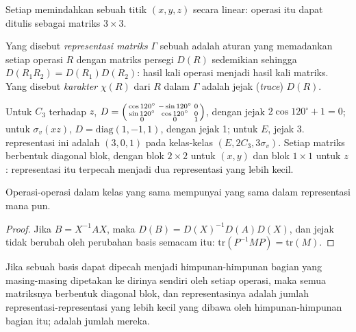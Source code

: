 Setiap  memindahkan sebuah titik $(x, y, z)$ secara linear:
operasi itu dapat ditulis sebagai matriks $3\times3$.

\begin{definition}\label{def:b3:point-groups:representation}
Yang disebut \emph{representasi matriks} $\Gamma$
sebuah  adalah aturan yang memadankan setiap operasi $R$ dengan
matriks persegi $D(R)$ sedemikian sehingga $D(R_1R_2) = D(R_1)D(R_2)$: hasil
kali operasi menjadi hasil kali matriks. Yang disebut
\emph{karakter} $\chi(R)$ dari $R$ dalam $\Gamma$ adalah jejak (\textit{trace})
$D(R)$.
\end{definition}

\begin{example}\label{ex:b3:point-groups:xyz}
Untuk $C_3$ terhadap $z$, $D = \begin{psmallmatrix}\cos120^\circ & -\sin120^\circ &
0\\ \sin120^\circ & \cos120^\circ & 0\\ 0 & 0 & 1\end{psmallmatrix}$, dengan
jejak $2\cos120^\circ + 1 = 0$; untuk $\sigma_v(xz)$,
$D = \mathrm{diag}(1, -1, 1)$, dengan jejak 1; untuk $E$, jejak 3.
 representasi ini adalah $(3, 0, 1)$ pada kelas-kelas
$(E, 2C_3, 3\sigma_v)$. Setiap matriks berbentuk diagonal blok, dengan blok
$2\times2$ untuk $(x, y)$ dan blok $1\times1$ untuk $z$: representasi itu
terpecah menjadi dua representasi yang lebih kecil.
\end{example}

\begin{proposition}\label{prop:b3:point-groups:class-characters}
Operasi-operasi dalam kelas yang sama mempunyai  yang sama dalam
representasi mana pun.
\end{proposition}

\begin{proof}
Jika $B = X^{-1}AX$, maka $D(B) = D(X)^{-1}D(A)D(X)$, dan jejak tidak berubah
oleh perubahan basis semacam itu: $\mathrm{tr}(P^{-1}MP) = \mathrm{tr}(M)$.
\end{proof}

\begin{proposition}\label{prop:b3:point-groups:direct-sum}
Jika sebuah basis dapat dipecah menjadi himpunan-himpunan bagian yang
masing-masing dipetakan ke dirinya sendiri oleh setiap operasi, maka semua
matriksnya berbentuk diagonal blok, dan representasinya adalah jumlah
representasi-representasi yang lebih kecil yang dibawa oleh
himpunan-himpunan bagian itu;  adalah jumlah  mereka.
\end{proposition}

